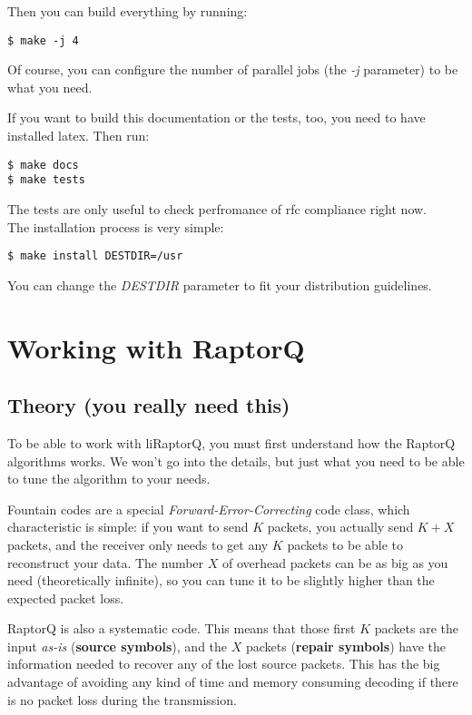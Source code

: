 \documentclass[11pt,a4paper]{refart}
\begin{document}
Then you can build everything by running:
\begin{verbatim}
$ make -j 4
\end{verbatim}
Of course, you can configure the number of parallel jobs (the \textit{-j} parameter) to be what you need.

If you want to build this documentation or the tests, too, you need to have installed latex. Then run:
\begin{verbatim}
$ make docs
$ make tests
\end{verbatim}
The tests are only useful to check perfromance of rfc compliance right now.\\

The installation process is very simple:

\begin{verbatim}
$ make install DESTDIR=/usr
\end{verbatim}

You can change the \textit{DESTDIR} parameter to fit your distribution guidelines.
\newpage


\section{Working with RaptorQ}
\subsection{Theory (you really need this)}

To be able to work with liRaptorQ, you must first understand how the RaptorQ algorithms works. We won't go into the details, but just what you need
to be able to tune the algorithm to your needs.


Fountain codes are a special \textit{Forward-Error-Correcting} code class, which characteristic is simple: if you want to send $K$ packets, you actually
send $K+X$ packets, and the receiver only needs to get any $K$ packets to be able to reconstruct your data. The number $X$ of overhead packets can be as big
as you need (theoretically infinite), so you can tune it to be slightly higher than the expected packet loss.

 RaptorQ is also a systematic code. This means that those first $K$ packets are the input \textit{as-is} (\textbf{source symbols}),
and the $X$ packets (\textbf{repair symbols}) have the information needed to recover any of the lost source packets. This has the big advantage of
avoiding any kind of time and memory consuming decoding if there is no packet loss during the transmission.
\end{document}
